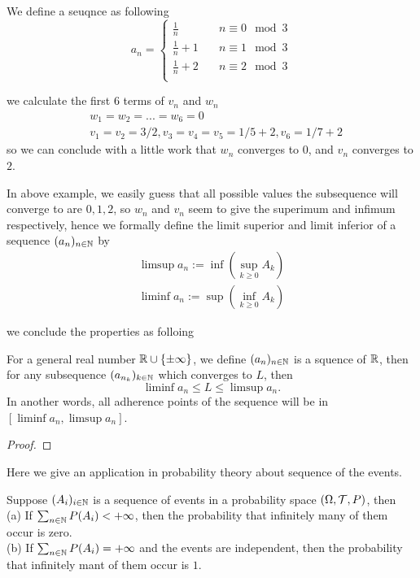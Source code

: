 \documentclass[en,geye,blue,normal,12pt,bibend=bibtex]{elegantnote}
\begin{document}
\begin{example}
    We define a seuqnce as following
    \[a_n = \begin{cases}
        \frac{1}{n} \quad &n \equiv 0 \mod 3 \\
        \frac{1}{n}+1 \quad &n \equiv 1 \mod 3 \\
        \frac{1}{n}+2 \quad &n \equiv 2 \mod 3 \\
    \end{cases}\]

    we calculate the first 6 terms of \(v_n\) and \(w_n\)
    \begin{align*}
        &w_1 = w_2 = ... = w_6 = 0 \\
        &v_1 = v_2 = 3/2, v_3 = v_4 = v_5= 1/5+2, v_6 =1/7+2
    \end{align*}
    so we can conclude with a little work that \(w_n\) converges to \(0\), and \(v_n\) converges to \(2\). 
\end{example}
In above example, we easily guess that all possible values the subsequence will converge to are \(0,1,2\), so \(w_n\) and \(v_n\) seem to give the superimum and infimum respectively, hence we formally define the limit superior and limit inferior of a sequence \((a_n)_{n \in \mathbb{N}}\) by
\begin{align*}
    \limsup a_n := \inf (\sup_{k \geq 0} A_k) \\
    \liminf a_n := \sup (\inf_{k \geq 0} A_k)
\end{align*}

we conclude the properties as folloing
\begin{proposition}
    For a general real number \(\mathbb{R} \cup \{\pm \infty\}\), we define \((a_n)_{n \in \mathbb{N}}\) is a squence of \( \mathbb{R}\), then for any subsequence \((a_{n_k})_{k \in \mathbb{N}}\) which converges to \(L\), then 
    \[\liminf a_n  \leq L \leq \limsup a_n.\]
    In another words, all adherence points of the sequence will be in \([\liminf a_n,\limsup a_n ]\).

    \begin{proof}
        
    \end{proof}
\end{proposition}
 
Here we give an application in probability theory about sequence of the events.
\begin{theorem}
    Suppose \((A_i)_{i \in \mathbb{N}}\) is a sequence of events in a probability space \((\Omega, \mathcal{T}, P)\), then \\
    (a) If \(\sum_{n \in \mathbb{N}}P(A_i) < +\infty\), then the probability that infinitely many of them occur is zero.\\
    (b) If \(\sum_{n \in \mathbb{N}}P(A_i) = +\infty\) and the events are independent, then the probability that infinitely mant of them occur is \(1\).
\end{theorem}
\end{document}
